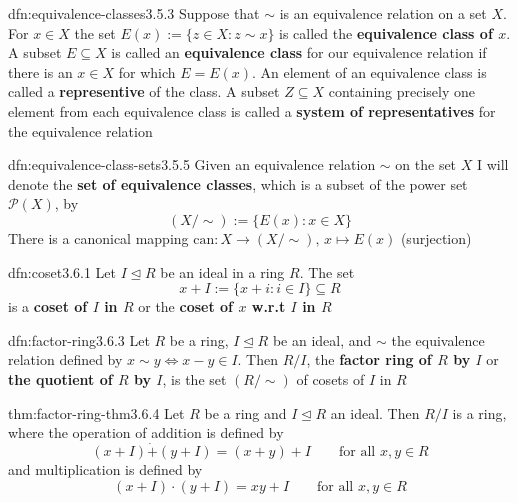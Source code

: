 \documentclass[landscape, 8pt]{extarticle}
\begin{document}
\begin{multicols}{3}
\begin{dfn}{dfn:equivalence-classes}{3.5.3}
    Suppose that $\sim$ is an equivalence relation on a set $X$. For $x\in X$ the set $E(x) := \{z\in X : z \sim x\}$ is called the \textbf{equivalence class of $x$}. A subset $E \subseteq X$ is called an \textbf{equivalence class} for our equivalence relation if there is an $x\in X$ for which $E = E(x)$. An element of an equivalence class is called a \textbf{representive} of the class. A subset $Z \subseteq X$ containing precisely one element from each equivalence class is called a \textbf{system of representatives} for the equivalence relation
\end{dfn}

\begin{dfn}{dfn:equivalence-class-sets}{3.5.5}
    Given an equivalence relation $\sim$ on the set $X$ I will denote the \textbf{set of equivalence classes}, which is a subset of the power set $\mathcal{P}(X)$, by
    \[(X / \sim) := \{E(x) : x\in X\}\]
    There is a canonical mapping $\text{can}: X \to (X / \sim),\, x\mapsto E(x)$ (surjection)
\end{dfn}

\begin{dfn}[Coset]{dfn:coset}{3.6.1}
    Let $I \unlhd R$ be an ideal in a ring $R$. The set
    \[ x + I := \{x + i : i\in I\} \subseteq R\]
    is a \textbf{coset of $I$ in $R$} or the \textbf{coset of $x$ w.r.t $I$ in $R$}
\end{dfn}

\begin{dfn}{dfn:factor-ring}{3.6.3}
    Let $R$ be a ring, $I \unlhd R$ be an ideal, and $\sim$ the equivalence relation defined by $x \sim y \iff x - y \in I$. Then $R / I$, the \textbf{factor ring of $R$ by $I$} or \textbf{the quotient of $R$ by $I$}, is the set $(R / \sim)$ of cosets of $I$ in $R$
\end{dfn}

\begin{thm}[]{thm:factor-ring-thm}{3.6.4}
    Let $R$ be a ring and $I \unlhd R$ an ideal. Then $R / I$ is a ring, where the operation of addition is defined by
    \[(x + I) \dot{+} (y + I) = (x + y) + I \qquad \text{for all $x,y\in R$}\]
    and multiplication is defined by
    \[(x + I) \cdot (y + I) = xy + I \qquad \text{for all $x,y\in R$}\]
\end{thm}

\newpage


\end{multicols}
\end{document}
